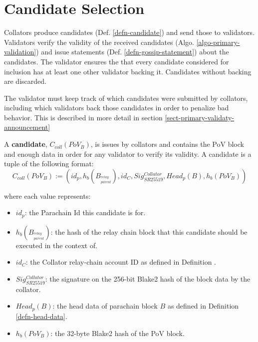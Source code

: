 \section{Candidate Selection}
\label{sect-primary-validation}

Collators produce candidates (Def. \ref{defn-candidate}) and send those to
validators. Validators verify the validity of the received candidates (Algo.
\ref{algo-primary-validation}) and issue statements (Def.
\ref{defn-gossip-statement}) about the candidates. The validator ensures the
that every candidate considered for inclusion has at least one other validator
backing it. Candidates without backing are discarded.
\newline

The validator must keep track of which candidates were submitted by collators, including
which validators back those candidates in order to penalize bad behavior. This is described
in more detail in section \ref{sect-primary-validaty-announcement}
\newline

\begin{definition}
  \label{defn-candidate}
  A \textbf{candidate}, $C_{coll}(PoV_B)$, is issues by collators and contains the PoV
  block and enough data in order for any validator to verify its validity. A
  candidate is a tuple of the following format:
  \[
  C_{coll}(PoV_B) := (id_p, h_b({B_{^{relay}_{parent}}}), id_{C}, Sig^{Collator}_{SR25519}, Head_p(B), h_b({PoV_B}))
  \]

  where each value represents:
  \begin{itemize}
    \item $id_p$: the Parachain Id this candidate is for.
    \item $h_b({B_{^{relay}_{parent}}})$: the hash of the relay chain block that this
    candidate should be executed in the context of.
    \item $id_C$: the Collator relay-chain account ID as defined in Definition
    .
    \item $Sig^{Collator}_{SR25519}$: the signature on the 256-bit Blake2 hash
    of the block data by the collator.
    \item $Head_p(B)$: the head data of parachain block $B$ as defined in
    Definition \ref{defn-head-data}.
    \item $h_b({PoV_B})$: the 32-byte Blake2 hash of the PoV block.
  \end{itemize}

\end{definition}

